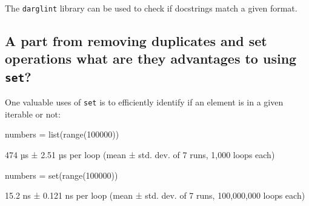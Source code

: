 The \texttt{darglint} library can be used
to check if docstrings match a given format.


\subsection{A part from removing duplicates and set operations what are they advantages to using \texttt{set}?}
\label{\detokenize{building-tools/02-functions-and-data-structures/why/main:a-part-from-removing-duplicates-and-set-operations-what-are-they-advantages-to-using-set}}

One valuable uses of \texttt{set} is to efficiently identify if an element
is in a given iterable or not:

\begin{pyin}
numbers = list(range(100000))
\end{pyin}





\begin{raw}
474 µs ± 2.51 µs per loop (mean ± std. dev. of 7 runs, 1,000 loops each)
\end{raw}



\begin{pyin}
numbers = set(range(100000))
\end{pyin}





\begin{raw}
15.2 ns ± 0.121 ns per loop (mean ± std. dev. of 7 runs, 100,000,000 loops each)
\end{raw}
